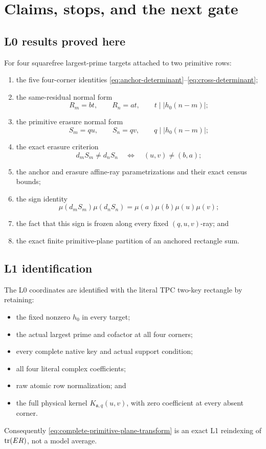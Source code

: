 \section{Claims, stops, and the next gate}
\label{sec:claim-boundary}

\subsection{L0 results proved here}

For four squarefree largest-prime targets attached to two primitive rows:
\begin{enumerate}[label=\textup{(\arabic*)},leftmargin=3em]
 \item the five four-corner identities
       \eqref{eq:anchor-determinant}--\eqref{eq:cross-determinant};
 \item the same-residual normal form
       \[
       R_m=bt,\qquad R_n=at,\qquad t\mid |h_0(n-m)|;
       \]
 \item the primitive erasure normal form
       \[
       S_m=qu,\qquad S_n=qv,\qquad
       q\mid |h_0(n-m)|;
       \]
 \item the exact erasure criterion
       \[
       d_mS_m\ne d_nS_n
       \quad\Longleftrightarrow\quad
       (u,v)\ne(b,a);
       \]
 \item the anchor and erasure affine-ray parametrizations and their exact
       census bounds;
 \item the sign identity
       \[
       \mu(d_mS_m)\mu(d_nS_n)
       =\mu(a)\mu(b)\mu(u)\mu(v);
       \]
 \item the fact that this sign is frozen along every fixed
       \((q,u,v)\)-ray; and
 \item the exact finite primitive-plane partition of an anchored
       rectangle sum.
\end{enumerate}

\subsection{L1 identification}

The L0 coordinates are identified with the literal TPC two-key rectangle
by retaining:
\begin{itemize}
 \item the fixed nonzero \(h_0\) in every target;
 \item the actual largest prime and cofactor at all four corners;
 \item every complete native key and actual support condition;
 \item all four literal complex coefficients;
 \item raw atomic row normalization; and
 \item the full physical kernel \(K_{\mathfrak a,q}(u,v)\), with zero
       coefficient at every absent corner.
\end{itemize}
Consequently \eqref{eq:complete-primitive-plane-transform} is an exact L1
reindexing of \(\operatorname{tr}(ER)\), not a model average.

